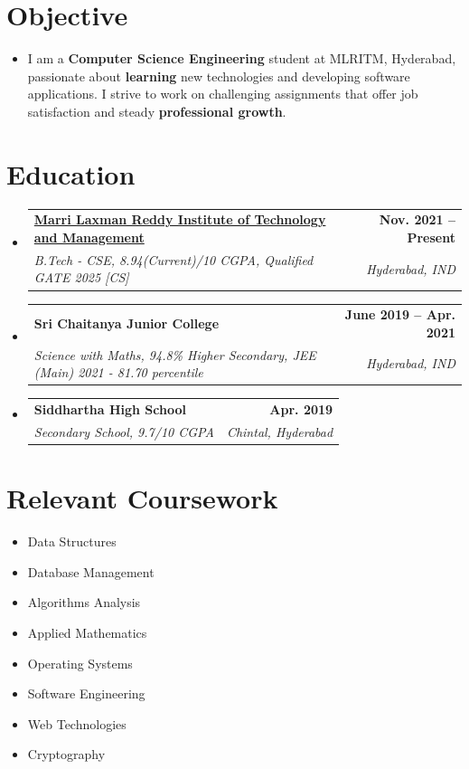 \documentclass[a4paper,11pt]{article}
\makeatletter
\newcommand{\resumeSubheading}[4]{
  \vspace{-2pt}\item
    \begin{tabular*}{0.97\textwidth}[t]{l@{\extracolsep{\fill}}r}
      \textbf{#1} & \textbf{\small #2} \\
      \textit{\small#3} & \textit{\small #4} \\
    \end{tabular*}\vspace{-7pt}
}
\newcommand{\resumeSubHeadingListStart}{\begin{itemize}[leftmargin=0.15in, label={}]}
\newcommand{\resumeSubHeadingListEnd}{\end{itemize}}
\makeatother
\begin{document}
\section{Objective}
  \begin{itemize}[leftmargin=0.15in, label={}]
    \item \fontsize{10}{12} {\selectfont
    I am a \textbf{Computer Science Engineering} student at MLRITM, Hyderabad, passionate about \textbf{learning} new technologies and developing software applications. I strive to work on challenging assignments that offer job satisfaction and steady \textbf{professional growth}.}
  \end{itemize}

\vspace{-15pt}
\section{Education}
  \resumeSubHeadingListStart
    \resumeSubheading
      {\href{https://mlritm.ac.in}{Marri Laxman Reddy Institute of Technology and Management}}{Nov. 2021 -- Present}
        {B.Tech - CSE, 8.94(Current)/10 CGPA, Qualified GATE 2025 [CS]}{Hyderabad, IND}
    \resumeSubheading
      {Sri Chaitanya Junior College}{June 2019 -- Apr. 2021}
      {Science with Maths, 94.8\% Higher Secondary, JEE (Main) 2021 - 81.70 percentile}{Hyderabad, IND}
    \resumeSubheading
      {Siddhartha High School}{Apr. 2019}
      {Secondary School, 9.7/10 CGPA}{Chintal, Hyderabad}
  \resumeSubHeadingListEnd

\section{Relevant Coursework}
        \begin{multicols}{4}
            \begin{itemize}[itemsep=-3pt, parsep=3pt]
              \small
                \item Data Structures
                \item Database Management
                \item Algorithms Analysis
                \item Applied Mathematics
                \item Operating Systems
                \item Software Engineering
                \item Web Technologies
                \item Cryptography
              \end{itemize}
        \end{multicols}
        \vspace*{2.0\multicolsep}
\end{document}
